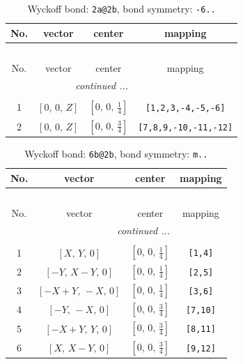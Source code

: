 \documentclass[fleqn,8pt]{jsarticle}
\begin{document}
\begin{longtable}{cccc}
\caption{Wyckoff bond: {\tt 2a@2b}, bond symmetry: {\tt -6..}}
 \\
 \hline \hline
No. & vector & center & mapping \\ \hline \endfirsthead

\multicolumn{3}{l}{\tablename\ \thetable{}} \\
 \hline \hline
No. & vector & center & mapping \\ \hline \endhead

 \hline \hline
\multicolumn{3}{r}{\footnotesize\it continued ...} \\ \endfoot

 \hline \hline
\multicolumn{3}{r}{} \\ \endlastfoot

1 & $\left[ 0,\, 0,\, Z \right]$ & $\left[ 0,\, 0,\, \frac{1}{4} \right]$ & {\tt [1,2,3,-4,-5,-6]} \\ \hline
2 & $\left[ 0,\, 0,\, Z \right]$ & $\left[ 0,\, 0,\, \frac{3}{4} \right]$ & {\tt [7,8,9,-10,-11,-12]} \\
\end{longtable}
\renewcommand{\arraystretch}{1.2}
\begin{longtable}{cccc}
\caption{Wyckoff bond: {\tt 6b@2b}, bond symmetry: {\tt m..}}
 \\
 \hline \hline
No. & vector & center & mapping \\ \hline \endfirsthead

\multicolumn{3}{l}{\tablename\ \thetable{}} \\
 \hline \hline
No. & vector & center & mapping \\ \hline \endhead

 \hline \hline
\multicolumn{3}{r}{\footnotesize\it continued ...} \\ \endfoot

 \hline \hline
\multicolumn{3}{r}{} \\ \endlastfoot

1 & $\left[ X,\, Y,\, 0 \right]$ & $\left[ 0,\, 0,\, \frac{1}{4} \right]$ & {\tt [1,4]} \\ \hline
2 & $\left[ - Y,\, X - Y,\, 0 \right]$ & $\left[ 0,\, 0,\, \frac{1}{4} \right]$ & {\tt [2,5]} \\ \hline
3 & $\left[ - X + Y,\, - X,\, 0 \right]$ & $\left[ 0,\, 0,\, \frac{1}{4} \right]$ & {\tt [3,6]} \\ \hline
4 & $\left[ - Y,\, - X,\, 0 \right]$ & $\left[ 0,\, 0,\, \frac{3}{4} \right]$ & {\tt [7,10]} \\ \hline
5 & $\left[ - X + Y,\, Y,\, 0 \right]$ & $\left[ 0,\, 0,\, \frac{3}{4} \right]$ & {\tt [8,11]} \\ \hline
6 & $\left[ X,\, X - Y,\, 0 \right]$ & $\left[ 0,\, 0,\, \frac{3}{4} \right]$ & {\tt [9,12]} \\
\end{longtable}
\end{document}
